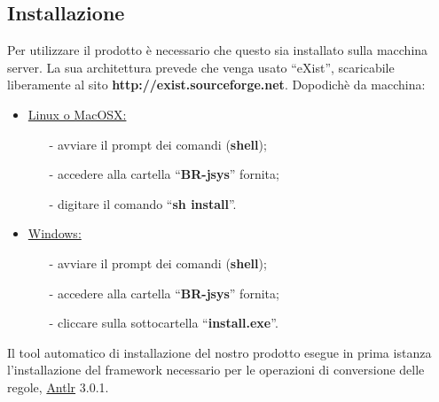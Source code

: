 \subsection{Installazione}
Per utilizzare il prodotto \`e necessario che questo sia installato sulla macchina server. La sua architettura prevede che venga usato ``eXist'', scaricabile liberamente al sito \textbf{http://exist.sourceforge.net}. Dopodich\`e da macchina:
\begin{itemize}
\item \underline{Linux o MacOSX:} 
\begin{itemize}
\item[-] avviare il prompt dei comandi (\textbf{shell});
\item[-] accedere alla cartella ``\textbf{BR-jsys}'' fornita; 
\item[-] digitare il comando ``\textbf{sh install}''.
\end{itemize}
\item \underline{Windows:}
\begin{itemize} 
\item[-] avviare il prompt dei comandi (\textbf{shell});
\item[-] accedere alla cartella ``\textbf{BR-jsys}'' fornita;
\item[-] cliccare sulla sottocartella ``\textbf{install.exe}''.
\end{itemize}
\end{itemize}
Il tool automatico di installazione del nostro prodotto esegue in prima istanza l'installazione del framework necessario per le operazioni di conversione delle regole, \underline{Antlr} 3.0.1.
